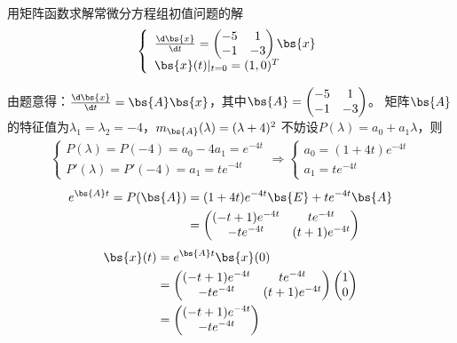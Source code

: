 \documentclass[12pt, a4paper, oneside, UTF8]{ctexbook}
\begin{document}
\begin{question}
    用矩阵函数求解常微分方程组初值问题的解
    \begin{align*}
    \left\{
        \begin{array}{ll}
            \frac{\d \bs{x}}{\d t}=\begin{pmatrix}
                -5 &1\\
                -1&-3
            \end{pmatrix}\bs{x}\\
            \bs{x}(t)|_{t=0}=(1,0)^T
        \end{array}
        \right.
    \end{align*}
\end{question}

\begin{solution}
    由题意得：$\frac{\d \bs{x}}{\d t}=\bs{A}\bs{x}$，其中$\bs{A}=\begin{pmatrix}
        -5&1\\
        -1&-3
    \end{pmatrix}$。
    矩阵$\bs{A}$的特征值为$\lambda_1=\lambda_2=-4$，$m_{\bs{A}}(\lambda)=(\lambda+4)^2$
    不妨设$P(\lambda)=a_0+a_1\lambda$，则 \begin{align*}
        \left\{
            \begin{array}{ll}
                P(\lambda)=P(-4)=a_0-4a_1=e^{-4t}\\
                P'(\lambda)=P'(-4)=a_1=te^{-4t}
            \end{array}
            \right.
        \Rightarrow
        \left\{
            \begin{array}{ll}
                a_0=(1+4t)e^{-4t}\\
                a_1=te^{-4t}
            \end{array}
            \right.
    \end{align*}
    \begin{align*}
        e^{\bs{A}t}=P(\bs{A})
    &=(1+4t)e^{-4t}\bs{E}+te^{-4t}\bs{A}\\
    &=\begin{pmatrix}
        (-t+1)e^{-4t} &te^{-4t} \\
        -te^{-4t}  & (t+1)e^{-4t}
    \end{pmatrix}
    \end{align*}
    \begin{align*}
        \bs{x}(t)&=e^{\bs{A}t}\bs{x}(0)\\
        &=\begin{pmatrix}
            (-t+1)e^{-4t} &te^{-4t} \\
        -te^{-4t}  & (t+1)e^{-4t}
        \end{pmatrix}\begin{pmatrix}
            1 \\
            0
        \end{pmatrix}\\
        &=\begin{pmatrix}
            (-t+1)e^{-4t} \\
            -te^{-4t} 
        \end{pmatrix}
        \end{align*}
\end{solution}
\end{document}
